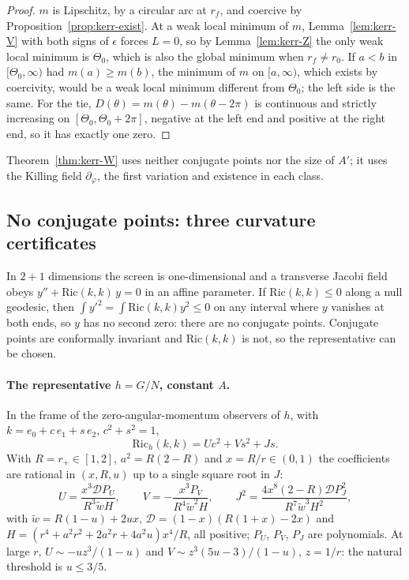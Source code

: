 \documentclass[aip,jmp,amsmath,amssymb,reprint]{revtex4-2}
\theoremstyle{plain}
\theoremstyle{definition}
\begin{document}
\begin{proof}
$m$ is Lipschitz, by a circular arc at $r_f$, and coercive by Proposition~\ref{prop:kerr-exist}. At a
weak local minimum of $m$, Lemma~\ref{lem:kerr-V} with both signs of $\epsilon$ forces $L=0$, so by
Lemma~\ref{lem:kerr-Z} the only weak local minimum is $\Theta_0$, which is also the global minimum when
$r_f\ne r_0$. If $a<b$ in $[\Theta_0,\infty)$ had $m(a)\ge m(b)$, the minimum of $m$ on $[a,\infty)$, which exists by
coercivity, would be a weak local minimum different from $\Theta_0$; the left side is the same. For
the tie, $D(\theta)=m(\theta)-m(\theta-2\pi)$ is continuous and strictly increasing on $[\Theta_0,\Theta_0+2\pi]$, negative at
the left end and positive at the right end, so it has exactly one zero.
\end{proof}

Theorem~\ref{thm:kerr-W} uses neither conjugate points nor the size of $A'$; it uses the Killing
field $\partial_\varphi$, the first variation and existence in each class.

\subsection{No conjugate points: three curvature certificates}

In $2+1$ dimensions the screen is one-dimensional and a transverse Jacobi field obeys
$y''+\mathrm{Ric}(k,k)\,y=0$ in an affine parameter. If $\mathrm{Ric}(k,k)\le0$ along a null geodesic, then
$\int y'^2=\int\mathrm{Ric}(k,k)y^2\le0$ on any interval where $y$ vanishes at both ends, so $y$ has no second
zero: there are no conjugate points. Conjugate points are conformally invariant and
$\mathrm{Ric}(k,k)$ is not, so the representative can be chosen.

\paragraph{The representative $h=G/N$, constant $A$.} In the frame of the zero-angular-momentum
observers of $h$, with $k=e_0+c\,e_1+s\,e_2$, $c^2+s^2=1$,
\[
  \mathrm{Ric}_h(k,k)=U c^2+V s^2+J s .
\]
With $R=r_+\in[1,2]$, $a^2=R(2-R)$ and $x=R/r\in(0,1)$ the coefficients are rational in
$(x,R,u)$ up to a single square root in $J$:
\[
  U=\frac{x^3\mathcal DP_U}{R^3\tilde wH},\qquad V=-\frac{x^3P_V}{R^4\tilde w^2H},\qquad
  J^2=\frac{4x^8(2-R)\mathcal DP_J^2}{R^7\tilde w^3H^2},
\]
with $\tilde w=R(1-u)+2ux$, $\mathcal D=(1-x)(R(1+x)-2x)$ and $H=(r^4+a^2r^2+2a^2r+4a^2u)x^4/R$, all
positive; $P_U$, $P_V$, $P_J$ are polynomials. At large $r$, $U\sim-uz^3/(1-u)$ and
$V\sim z^3(5u-3)/(1-u)$, $z=1/r$: the natural threshold is $u\le3/5$.
\end{document}
